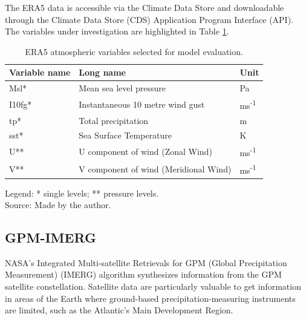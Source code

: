 The ERA5 data is accessible via the Climate Data Store and downloadable through the Climate Data Store (CDS) Application Program Interface (API). The variables under investigation are highlighted in Table \ref{tab:era5-variables}.

\begin{table}[htbp]
	\centering
	\caption{ERA5 atmospheric variables selected for model evaluation.}
	\label{tab:era5-variables}
	\begin{tabular}{@{}lll@{}}
		\toprule
		\textbf{Variable name} & \textbf{Long name} & \textbf{Unit} \\
		\midrule
		Msl*   & Mean sea level pressure               & Pa \\
		I10fg* & Instantaneous 10 metre wind gust      & ms\textsuperscript{-1} \\
		tp*    & Total precipitation                   & m \\
		sst*   & Sea Surface Temperature               & K \\
		U**    & U component of wind (Zonal Wind)      & ms\textsuperscript{-1} \\
		V**    & V component of wind (Meridional Wind) & ms\textsuperscript{-1} \\
		\bottomrule
	\end{tabular}
	
	\vspace{2mm}
	{\centering \small Legend: * single levels; ** pressure levels. \\ Source: Made by the author. \par}
\end{table}



\subsection{GPM-IMERG}

NASA’s Integrated Multi-satellite Retrievals for GPM (Global Precipitation Measurement) (IMERG) \cite{huffman2019gpm} algorithm synthesizes information from the GPM satellite constellation. Satellite data are particularly valuable to get information in areas of the Earth where ground-based precipitation-measuring instruments are limited, such as the Atlantic’s Main Development Region.

